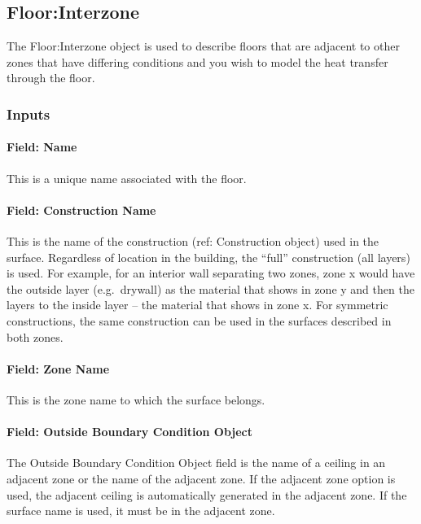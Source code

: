 \subsection{Floor:Interzone}\label{floorinterzone}

The Floor:Interzone object is used to describe floors that are adjacent to other zones that have differing conditions and you wish to model the heat transfer through the floor.

\subsubsection{Inputs}\label{inputs-13-016}

\paragraph{Field: Name}\label{field-name-9-019}

This is a unique name associated with the floor.

\paragraph{Field: Construction Name}\label{field-construction-name-9}

This is the name of the construction (ref: Construction object) used in the surface. Regardless of location in the building, the ``full'' construction (all layers) is used. For example, for an interior wall separating two zones, zone x would have the outside layer (e.g.~drywall) as the material that shows in zone y and then the layers to the inside layer -- the material that shows in zone x. For symmetric constructions, the same construction can be used in the surfaces described in both zones.

\paragraph{Field: Zone Name}\label{field-zone-name-9-001}

This is the zone name to which the surface belongs.

\paragraph{Field: Outside Boundary Condition Object}\label{field-outside-boundary-condition-object-2}

The Outside Boundary Condition Object field is the name of a ceiling in an adjacent zone or the name of the adjacent zone. If the adjacent zone option is used, the adjacent ceiling is automatically generated in the adjacent zone. If the surface name is used, it must be in the adjacent zone.

